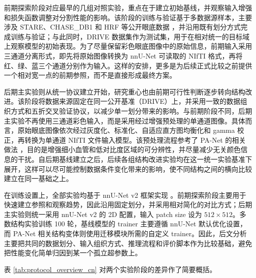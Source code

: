 \documentclass[a4paper,12pt]{article}
\begin{document}
前期探索阶段对应最早的几组对照实验，重点在于建立初始基线，并观察输入增强和损失函数调整对分割性能的影响。该阶段的训练与验证基于多数据源样本，主要涉及 STARE、CHASE\_DB1 和 HRF 等公开眼底数据 \cite{hoover2000locating,chasedb12013,budai2013robust}，并沿用既有划分方式完成训练与验证；与此同时，DRIVE 数据集作为测试集，用于在相对统一的目标域上观察模型的初始表现。为了尽量保留彩色眼底图像中的原始信息，前期输入采用三通道分离形式，即先将原始图像转换为 nnU-Net 可读取的 NIfTI 格式，再将红、绿、蓝三个通道分别作为输入。这样的安排，更多是为后续正式比较之前提供一个相对宽一点的前期参照，而不是直接形成最终方案。

后期主实验则从统一协议建立开始，研究重心也由前期可行性判断逐步转向结构改进。该阶段将数据来源固定在同一公开基准（DRIVE）上，并采用一致的数据组织方式和五折交叉验证协议，以减少单一划分带来的影响。与前期阶段不同，后期主实验不再使用三通道彩色输入，而是采用经过增强预处理的单通道图像。具体而言，原始眼底图像依次经过灰度化、标准化、自适应直方图均衡化和 gamma 校正，再转换为单通道 NIfTI 文件输入模型。该预处理流程参考了 PA-Net 的相关做法 \cite{luo2025panet}，目的是增强细小血管和低对比度区域的可分辨性，并尽量减少无关颜色信息的干扰。自后期基线建立之后，后续各组结构改进实验均在这一统一实验基准下展开，这样可以尽可能控制数据条件变化带来的影响，使不同结构之间的横向比较建立在同一基础之上。

在训练设置上，全部实验均基于 nnU-Net v2 框架实现 \cite{isensee2021nnunet}。前期探索阶段主要用于快速建立参照和观察趋势，因此沿用固定划分，并采用相对简化的对比方式；后期主实验则统一采用 nnU-Net v2 的 2D 配置，输入 patch size 设为 \(512 \times 512\)。多数结构实验训练 100 轮，基线模型的 trainer 主要遵循 nnU-Net 默认优化设置，而 PA-Net 相关结构变体则使用迁移模块所需的自定义 trainer。因此，后文分析主要把共同的数据划分、输入组织方式、推理流程和评价脚本作为比较基础，避免把性能变化简单归因到某一个孤立超参数上。

表 \ref{tab:protocol_overview_cn} 对两个实验阶段的差异作了简要概括。

\begin{table}[htbp]
\centering
\caption{两个实验阶段的整体对比}
\label{tab:protocol_overview_cn}
\end{table}
\end{document}
